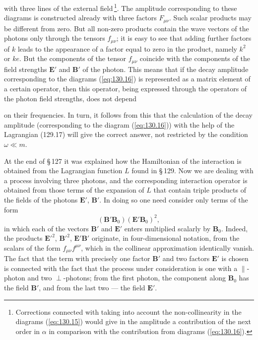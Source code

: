 \noindent with three lines of the external field\,\footnote{Corrections connected with taking into account the non-collinearity in the diagrams (\ref{eq:130.15}) would give in the amplitude a contribution of the next order in $\alpha$ in comparison with the contribution from diagrams (\ref{eq:130.16}).}. The amplitude corresponding to these diagrams is constructed already with three factors $F_{\mu\nu}$. Such scalar products may be different from zero. But all non-zero products contain the wave vectors of the photons only through the tensors $f_{\mu\nu}$; it is easy to see that adding further factors of $k$ leads to the appearance of a factor equal to zero in the product, namely $k^2$ or $ke$. But the components of the tensor $f_{\mu\nu}$ coincide with the components of the field strengths $\mathbf{E}'$ and $\mathbf{B}'$ of the photon. This means that if the decay amplitude corresponding to the diagrams (\ref{eq:130.16}) is represented as a matrix element of a certain operator, then this operator, being expressed through the operators of the photon field strengths, does not depend


\noindent on their frequencies. In turn, it follows from this that the calculation of the decay amplitude (corresponding to the diagram (\ref{eq:130.16})) with the help of the Lagrangian (129.17) will give the correct answer, not restricted by the condition $\omega \ll m$.

At the end of \S\,127 it was explained how the Hamiltonian of the interaction is obtained from the Lagrangian function $L$ found in \S\,129. Now we are dealing with a process involving three photons, and the corresponding interaction operator is obtained from those terms of the expansion of $L$ that contain triple products of the fields of the photons $\mathbf{E}'$, $\mathbf{B}'$. In doing so one need consider only terms of the form
\begin{equation}
(\mathbf{B}'\mathbf{B}_0)(\mathbf{E}'\mathbf{B}_0)^2,
\label{eq:130.17}
\end{equation}
in which each of the vectors $\mathbf{B}'$ and $\mathbf{E}'$ enters multiplied scalarly by $\mathbf{B}_0$. Indeed, the products $\mathbf{E}'^2$, $\mathbf{B}'^2$, $\mathbf{E}'\mathbf{B}'$ originate, in four-dimensional notation, from the scalars of the form $f_{\mu\nu}f^{\mu\nu}$, which in the collinear approximation identically vanish. The fact that the term with precisely one factor $\mathbf{B}'$ and two factors $\mathbf{E}'$ is chosen is connected with the fact that the process under consideration is one with a $\parallel$-photon and two $\perp$-photons; from the first photon, the component along $\mathbf{B}_0$ has the field $\mathbf{B}'$, and from the last two --- the field $\mathbf{E}'$.

